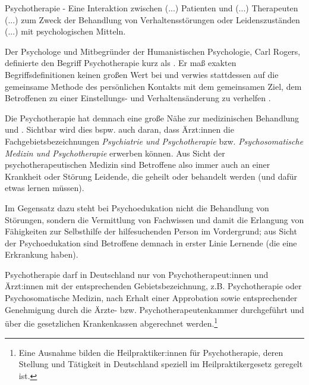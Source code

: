 \documentclass[
  twoside,
  parskip=half-,
]{scrreprt}
\begin{document}
\begin{displayquote}
  Psychotherapie - Eine Interaktion zwischen (...) Patienten und (...) Therapeuten (...) zum Zweck der Behandlung von Verhaltensstörungen oder Leidenszuständen (...) mit psychologischen Mitteln.
\end{displayquote}

Der Psychologe und Mitbegründer der Humanistischen Psychologie, Carl Rogers, definierte den Begriff Psychotherapie kurz als . Er maß exakten Begriffsdefinitionen keinen großen Wert bei und verwies stattdessen auf die gemeinsame Methode des persönlichen Kontakts mit dem gemeinsamen Ziel, dem Betroffenen zu einer Einstellungs- und Verhaltensänderung zu verhelfen \autocite[vgl.][17]{rogers1942}.

Die Psychotherapie hat demnach eine große Nähe zur medizinischen Behandlung und . Sichtbar wird dies bspw. auch daran, dass Ärzt:innen die Fachgebietsbezeichnungen \textit{Psychiatrie und Psychotherapie} bzw. \textit{Psychosomatische Medizin und Psychotherapie} erwerben können. Aus Sicht der psychotherapeutischen Medizin sind Betroffene also immer auch an einer Krankheit oder Störung Leidende, die geheilt oder behandelt werden (und dafür etwas lernen müssen). 

Im Gegensatz dazu steht bei Psychoedukation nicht die Behandlung von Störungen, sondern die Vermittlung von Fachwissen und damit die Erlangung von Fähigkeiten zur Selbsthilfe der hilfesuchenden Person im Vordergrund; aus Sicht der Psychoedukation sind Betroffene demnach in erster Linie Lernende (die eine Erkrankung haben). 

Psychotherapie darf in Deutschland nur von Psychotherapeut:innen und Ärzt:innen mit der entsprechenden Gebietsbezeichnung, z.B. Psychotherapie oder Psychosomatische Medizin, nach Erhalt einer Approbation sowie entsprechender Genehmigung durch die Ärzte- bzw. Psychotherapeutenkammer durchgeführt und über die gesetzlichen Krankenkassen abgerechnet werden.\footnote{Eine Ausnahme bilden die Heilpraktiker:innen für Psychotherapie, deren Stellung und Tätigkeit in Deutschland speziell im Heilpraktikergesetz geregelt ist.} 
\end{document}
